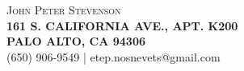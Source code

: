 \documentclass[10pt,letterpaper]{article}
\begin{document}
\begin{center}
{\huge{ \textsc{ { {{\mdseries John Peter}} {Stevenson} }}}} \\
\vspace{0.5em}
\textcolor{light-gray}{
\footnotesize{\textbf{161 S. CALIFORNIA AVE., APT. K200}}  \\
\footnotesize{\textbf{PALO ALTO, CA 94306              }}  \\
\footnotesize{{(650) 906-9549} | {etep.nosnevets@gmail.com}}
}
\end{center}

\end{document}

